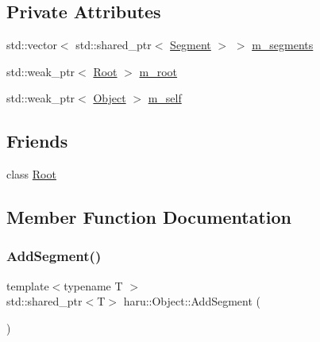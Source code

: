\subsection*{Private Attributes}
\begin{DoxyCompactItemize}
\item 
std\+::vector$<$ std\+::shared\+\_\+ptr$<$ \mbox{\hyperlink{classharu_1_1_segment}{Segment}} $>$ $>$ \mbox{\hyperlink{classharu_1_1_object_a657dae7e9caa350f40aac59d5c734ad1}{m\+\_\+segments}}
\item 
std\+::weak\+\_\+ptr$<$ \mbox{\hyperlink{classharu_1_1_root}{Root}} $>$ \mbox{\hyperlink{classharu_1_1_object_a46facc31fd20aa99a248e4bdb063a043}{m\+\_\+root}}
\item 
std\+::weak\+\_\+ptr$<$ \mbox{\hyperlink{classharu_1_1_object}{Object}} $>$ \mbox{\hyperlink{classharu_1_1_object_ae204b014fc8c7bedc74508da20420769}{m\+\_\+self}}
\end{DoxyCompactItemize}
\subsection*{Friends}
\begin{DoxyCompactItemize}
\item 
class \mbox{\hyperlink{classharu_1_1_object_a4966338964dbcd90cba2a6b4bd1b3521}{Root}}
\end{DoxyCompactItemize}


\subsection{Member Function Documentation}
\mbox{\label{classharu_1_1_object_ad285384303303dd6b281a570810f18ca}} 
\subsubsection{\texorpdfstring{Add\+Segment()}{AddSegment()}\hspace{0.1cm}{\footnotesize\ttfamily [1/4]}}
{\footnotesize\ttfamily template$<$typename T $>$ \\
std\+::shared\+\_\+ptr$<$T$>$ haru\+::\+Object\+::\+Add\+Segment (\begin{DoxyParamCaption}{ }\end{DoxyParamCaption})\hspace{0.3cm}{\ttfamily [inline]}}

